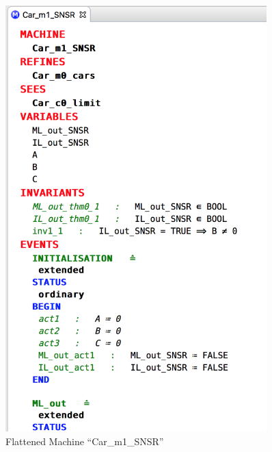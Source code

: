 \begin{figure}[!htbp]
	\includegraphics[width=0.9\textwidth]{figures/Flattened_var_m1_snsr}
	\fi
	\caption{Flattened Machine ``Car\_m1\_SNSR''}
	\label{fig:FlattenedMachine}
\end{figure}


